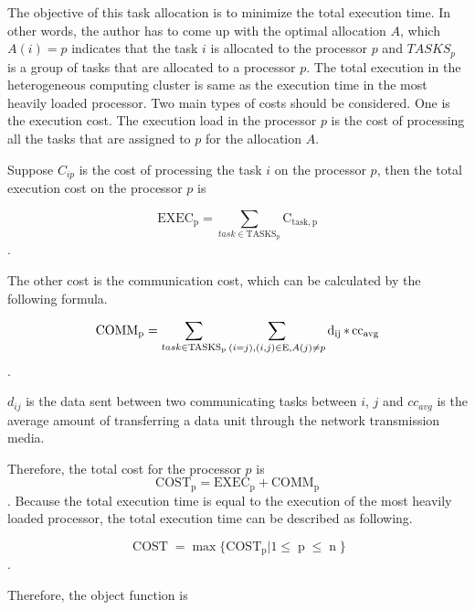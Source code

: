 The objective of this task allocation is to minimize the total execution time. In other words, the author has to come up with the optimal allocation $A$, which $A(i) = p$ indicates that the task $i$ is allocated to the processor $p$ and $TASKS_p$ is a group of tasks that are allocated to a processor $p$. The total execution in the heterogeneous computing cluster is same as the execution time in the most heavily loaded processor.  Two main types of costs should be considered. One is the execution cost.  The execution load in the processor $p$ is the cost of processing all the tasks that are assigned to $p$ for the allocation $A$. 

Suppose $C_{ip}$ is the cost of processing the task $i$ on the processor $p$, then the total execution cost on the processor $p$ is 
 
 \begin{equation}
\operatorname{EXEC_p } = \sum_{task \in  \operatorname{TASKS_p}} \operatorname{C_{task, p}}
 \end{equation}.
 
  The other cost is the communication cost, which can be calculated by the following formula.

\begin{equation}  
\operatorname{COMM_p} = \sum_{task \in \operatorname{TASKS_p}} \sum_{(i=j), \\(i, j) \in \operatorname{E} , \\ A(j) \neq p} \operatorname{d_{ij}} * \operatorname{cc_{avg}}
\end{equation}.

$d_{ij}$ is the data sent between two communicating tasks between $i$, $j$ and $cc_{avg}$ is the average amount of transferring a data unit through the network transmission media.
  
 Therefore, the total cost for the processor $p$ is 
 \begin{equation}
\operatorname{COST_p} = \operatorname{EXEC_p} + \operatorname{COMM_p}
 \end{equation}.
 Because the total execution time is equal to the execution of the most heavily loaded processor, the total execution time can be described as following.
 
 \begin{equation}
 \operatorname{COST} =  \operatorname{max} \{\operatorname{COST_p} | 1 \leq \operatorname{p} \leq \operatorname{n}\}
  \end{equation}.
 
 Therefore, the object function is 
 

